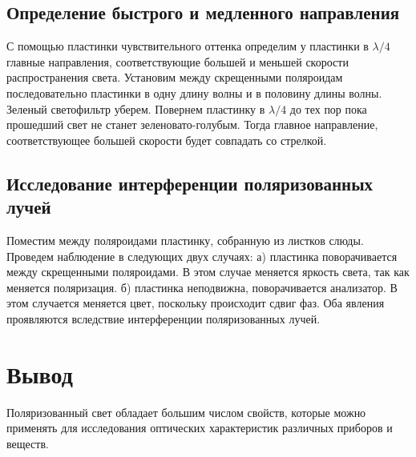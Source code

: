 \documentclass[a4paper,12pt]{article}
\begin{document}
		
		\subsection{Определение быстрого и медленного направления}
		С помощью пластинки чувствительного оттенка определим у
		пластинки в $\lambda/4$ главные направления, соответствующие большей и
		меньшей скорости распространения света. Установим между скрещенными 
	поляроидам последовательно пластинки в одну длину волны и в половину длины волны.
	Зеленый светофильтр уберем. Повернем пластинку в $\lambda/4$ до тех пор пока
	прошедший свет не станет зеленовато-голубым. Тогда главное направление,
	соответствующее большей скорости будет совпадать со стрелкой.
	
	\subsection{Исследование интерференции поляризованных лучей}
	Поместим между поляроидами пластинку, собранную из листков слюды. 
		Проведем наблюдение в следующих двух случаях: 
		а) пластинка поворачивается
		между скрещенными поляроидами. В этом случае меняется яркость света, так как меняется поляризация.
		б) пластинка неподвижна, поворачивается 
		анализатор. В этом случается меняется цвет, поскольку происходит сдвиг фаз.
		Оба явления проявляются вследствие интерференции поляризованных лучей.

	\section{Вывод}
	Поляризованный свет обладает большим числом свойств, которые можно применять для исследования оптических характеристик различных приборов и веществ.
	
\end{document}

